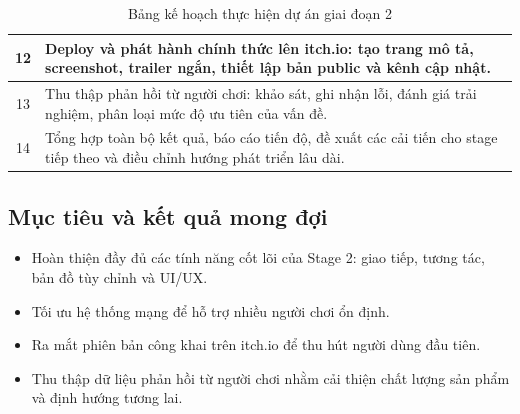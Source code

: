 \begin{table}[H]
\begin{tabular}{|c|p{11cm}|}
12 & Deploy và phát hành chính thức lên itch.io: tạo trang mô tả, screenshot, trailer ngắn, thiết lập bản public và kênh cập nhật. \\ \hline

13 & Thu thập phản hồi từ người chơi: khảo sát, ghi nhận lỗi, đánh giá trải nghiệm, phân loại mức độ ưu tiên của vấn đề. \\ \hline

14 & Tổng hợp toàn bộ kết quả, báo cáo tiến độ, đề xuất các cải tiến cho stage tiếp theo và điều chỉnh hướng phát triển lâu dài. \\ \hline

\end{tabular}
\caption{Bảng kế hoạch thực hiện dự án giai đoạn 2}
\end{table}




\subsection{Mục tiêu và kết quả mong đợi}

\begin{itemize}
    \item Hoàn thiện đầy đủ các tính năng cốt lõi của Stage 2: giao tiếp, tương tác, bản đồ tùy chỉnh và UI/UX.
    \item Tối ưu hệ thống mạng để hỗ trợ nhiều người chơi ổn định.
    \item Ra mắt phiên bản công khai trên itch.io để thu hút người dùng đầu tiên.
    \item Thu thập dữ liệu phản hồi từ người chơi nhằm cải thiện chất lượng sản phẩm và định hướng tương lai.
\end{itemize}


\newpage